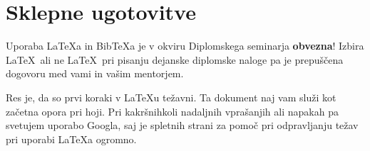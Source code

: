\documentclass[a4paper, 12pt]{book}
\newcommand{\BibTeX}{{\sc Bib}\TeX}
\begin{document}
\chapter{Sklepne ugotovitve}

Uporaba \LaTeX{a} in \BibTeX{a} je v okviru Diplomskega seminarja \textbf{obvezna}!
Izbira \LaTeX\ ali ne \LaTeX\ pri pisanju dejanske diplomske naloge pa je pre\-pu\-šče\-na dogovoru med vami in vašim mentorjem.

Res je, da so prvi koraki v \LaTeX{}u težavni. 
Ta dokument naj vam služi kot začetna opora pri hoji.
Pri kakršnihkoli nadaljnih vprašanjih ali napakah pa svetujem uporabo Googla, saj je spletnih strani za pomoč pri odpravljanju težav pri uporabi \LaTeX{}a ogromno.


\newpage %

\clearpage
{}


\end{document}

